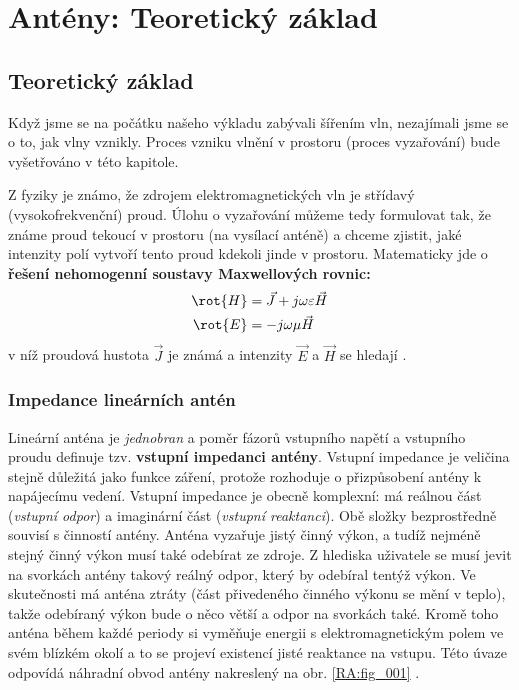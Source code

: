 \setchaptertoc
\chapter{Antény: Teoretický základ}\label{chap:ra_antennatheory}


  \section{Teoretický základ}
    Když jsme se na počátku našeho výkladu zabývali šířením vln, nezajímali jsme se o to, jak vlny 
    vznikly. Proces vzniku vlnění v prostoru (proces vyzařování) bude vyšetřováno v této kapitole. 
    
    Z fyziky je známo, že zdrojem elektromagnetických vln je střídavý (vysokofrekvenční) proud. 
    Úlohu o vyzařování můžeme tedy formulovat tak, že známe proud tekoucí v prostoru (na vysílací 
    anténě) a chceme zjistit, jaké intenzity polí vytvoří tento proud kdekoli jinde v prostoru. 
    Matematicky jde o \textbf{řešení nehomogenní soustavy Maxwellových rovnic:}
    \begin{align}\label{RA:eq_ant01}
      \rot{H} &= \vec{J} + j\omega\varepsilon\vec{H} \\
      \rot{E} &= -j\omega\mu\vec{H}
    \end{align}
    v níž proudová hustota \(\vec{J}\) je známá a intenzity \(\vec{E}\) a \(\vec{H}\) se hledají 
    \cite[s.~33]{Hanus2002}. 
    
    \subsection{Impedance lineárních antén}
      Lineární anténa je \emph{jednobran} a poměr fázorů vstupního napětí a vstupního proudu 
      definuje  tzv. \textbf{vstupní impedanci antény}. Vstupní impedance je veličina stejně 
      důležitá jako funkce záření, protože rozhoduje o přizpůsobení antény k napájecímu vedení. 
      Vstupní impedance je obecně komplexní: má reálnou část (\emph{vstupní odpor}) a imaginární 
      část (\emph{vstupní reaktanci}). Obě složky bezprostředně souvisí s činností antény. Anténa 
      vyzařuje jistý činný výkon, a tudíž nejméně stejný činný výkon musí také odebírat ze zdroje. 
      Z hlediska uživatele se musí jevit na svorkách antény takový reálný odpor, který by odebíral 
      tentýž výkon. Ve skutečnosti má anténa ztráty (část přivedeného činného výkonu se mění v 
      teplo), takže odebíraný výkon bude o něco větší a odpor na svorkách také. Kromě toho anténa 
      během každé periody si vyměňuje energii s elektromagnetickým polem ve svém blízkém 
      okolí a to se projeví existencí jisté reaktance na vstupu. Této úvaze odpovídá náhradní obvod 
      antény nakreslený na obr. \ref{RA:fig_001} \cite[s.~44]{Hanus2002}.

